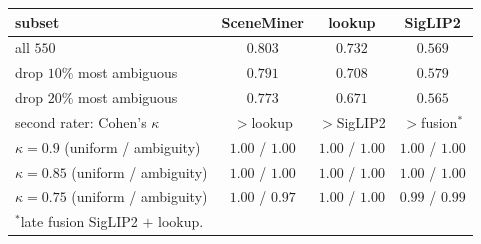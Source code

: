 \begin{tabular}{lccc}
\toprule
subset & SceneMiner & lookup & SigLIP2\\
\midrule
all $550$ & $0.803$ & $0.732$ & $0.569$\\
drop $10\%$ most ambiguous & $0.791$ & $0.708$ & $0.579$\\
drop $20\%$ most ambiguous & $0.773$ & $0.671$ & $0.565$\\
\midrule
second rater: Cohen's $\kappa$ & $>$lookup & $>$SigLIP2 & $>$fusion$^{\ast}$\\
\midrule
$\kappa=0.9$ (uniform / ambiguity) & $1.00$ / $1.00$ & $1.00$ / $1.00$ & $1.00$ / $1.00$\\
$\kappa=0.85$ (uniform / ambiguity) & $1.00$ / $1.00$ & $1.00$ / $1.00$ & $1.00$ / $1.00$\\
$\kappa=0.75$ (uniform / ambiguity) & $1.00$ / $0.97$ & $1.00$ / $1.00$ & $0.99$ / $0.99$\\
\bottomrule
\multicolumn{4}{l}{\footnotesize $^{\ast}$late fusion SigLIP2 $+$ lookup.}
\end{tabular}

